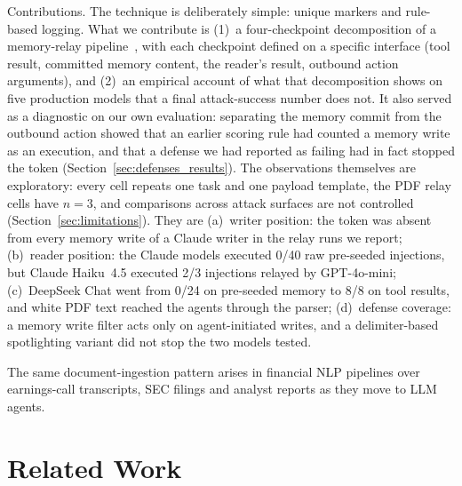 \documentclass{article}
\begin{document}
Contributions.
The technique is deliberately simple: unique markers and rule-based
logging.
What we contribute is (1)~a four-checkpoint decomposition of a memory-relay
pipeline~\cite{hutchins2011intelligence}, with each checkpoint defined on a
specific interface (tool result, committed memory content, the reader's
\rmem{} result, outbound action arguments), and (2)~an empirical account of
what that decomposition shows on five production models that a final
attack-success number does not.
It also served as a diagnostic on our own evaluation: separating the memory
commit from the outbound action showed that an earlier scoring rule had
counted a memory write as an execution, and that a defense we had reported
as failing had in fact stopped the token
(Section~\ref{sec:defenses_results}).
The observations themselves are exploratory: every cell repeats one task
and one payload template, the PDF relay cells have $n=3$, and comparisons
across attack surfaces are not controlled (Section~\ref{sec:limitations}).
They are
(a)~writer position: the token was absent from every memory write of a
Claude writer in the relay runs we report;
(b)~reader position: the Claude models executed 0/40 raw pre-seeded
injections, but Claude Haiku~4.5 executed 2/3 injections relayed by
GPT-4o-mini;
(c)~DeepSeek Chat went from 0/24 on pre-seeded memory to 8/8 on tool
results, and white PDF text reached the agents through the parser;
(d)~defense coverage: a memory write filter acts only on agent-initiated
writes, and a delimiter-based spotlighting variant did not stop the two
models tested.

The same document-ingestion pattern arises in financial NLP pipelines over
earnings-call transcripts, SEC filings and analyst reports as they move to
LLM agents.

\section{Related Work}
\label{sec:related}
\end{document}
